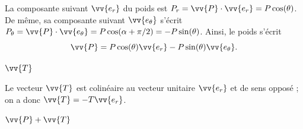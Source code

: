 
\begin{corrige}
La composante suivant $\vv{e_r}$ du poids est $P_r=\vv{P} \cdot \vv{e_r}=P\cos(\theta)$. De même, sa composante suivant $\vv{e_\theta}$ s'écrit $P_\theta=\vv{P}\cdot \vv{e_\theta}=P\cos(\alpha+\pi/2)=-P\sin(\theta)$. Ainsi, le poids s'écrit 
\[
\vv{P} = P \cos(\theta)\vv{e_r} - P \sin (\theta) \vv{e_\theta}.
\]
 \end{corrige}


\begin{enonce}
	$\vv{T}$
\end{enonce}


\begin{corrige}
Le vecteur $\vv{T}$ est colinéaire au vecteur unitaire $\vv{e_r}$ et de sens opposé ; on a donc $\vv{T} =-T \vv{e_r}$.
\end{corrige}


\begin{enonce}
	$\vv{P}+\vv{T}$
\end{enonce}




\finEntrainement



\newpage


\hauteurLargeurCadreReponse		{9mm}{4.75cm}
\initialisationEntrainement

